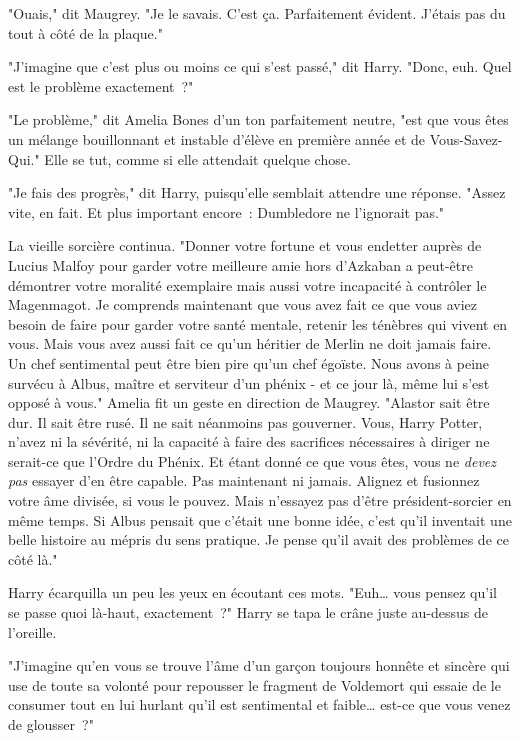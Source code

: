 "Ouais," dit Maugrey. "Je le savais. C'est ça. Parfaitement évident. J'étais pas du tout à côté de la plaque."

"J'imagine que c'est plus ou moins ce qui s'est passé," dit Harry. "Donc, euh. Quel est le problème exactement~?"

"Le problème," dit Amelia Bones d'un ton parfaitement neutre, "est que vous êtes un mélange bouillonnant et instable d'élève en première année et de Vous-Savez-Qui." Elle se tut, comme si elle attendait quelque chose.

"Je fais des progrès," dit Harry, puisqu'elle semblait attendre une réponse. "Assez vite, en fait. Et plus important encore~: Dumbledore ne l'ignorait pas."

La vieille sorcière continua. "Donner votre fortune et vous endetter auprès de Lucius Malfoy pour garder votre meilleure amie hors d'Azkaban a peut-être démontrer votre moralité exemplaire mais aussi votre incapacité à contrôler le Magenmagot. Je comprends maintenant que vous avez fait ce que vous aviez besoin de faire pour garder votre santé mentale, retenir les ténèbres qui vivent en vous. Mais vous avez aussi fait ce qu'un héritier de Merlin ne doit jamais faire. Un chef sentimental peut être bien pire qu'un chef égoïste. Nous avons à peine survécu à Albus, maître et serviteur d'un phénix - et ce jour là, même lui s'est opposé à vous." Amelia fit un geste en direction de Maugrey. "Alastor sait être dur. Il sait être rusé. Il ne sait néanmoins pas gouverner. Vous, Harry Potter, n'avez ni la sévérité, ni la capacité à faire des sacrifices nécessaires à diriger ne serait-ce que l'Ordre du Phénix. Et étant donné ce que vous êtes, vous ne \emph{devez pas} essayer d'en être capable. Pas maintenant ni jamais. Alignez et fusionnez votre âme divisée, si vous le pouvez. Mais n'essayez pas d'être président-sorcier en même temps. Si Albus pensait que c'était une bonne idée, c'est qu'il inventait une belle histoire au mépris du sens pratique. Je pense qu'il avait des problèmes de ce côté là."

Harry écarquilla un peu les yeux en écoutant ces mots. "Euh… vous pensez qu'il se passe quoi là-haut, exactement~?" Harry se tapa le crâne juste au-dessus de l'oreille.

"J'imagine qu'en vous se trouve l'âme d'un garçon toujours honnête et sincère qui use de toute sa volonté pour repousser le fragment de Voldemort qui essaie de le consumer tout en lui hurlant qu'il est sentimental et faible… est-ce que vous venez de glousser~?"

